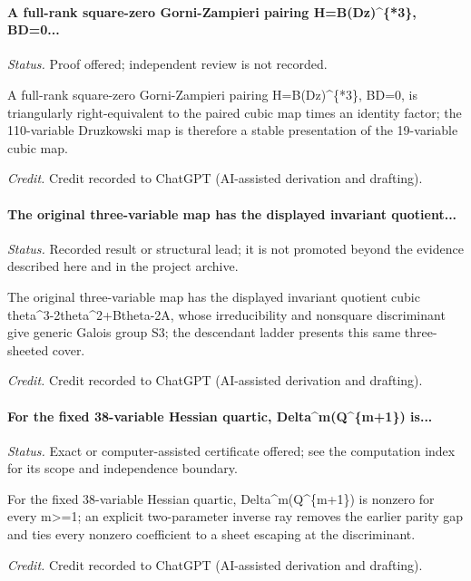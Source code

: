 \label{supp-note-05-019}
\paragraph{A full-rank square-zero Gorni-Zampieri pairing H=B(Dz)\textasciicircum{}\{*3\}, BD=0...}
\emph{Status.} Proof offered; independent review is not recorded.

A full-rank square-zero Gorni-Zampieri pairing H=B(Dz)\textasciicircum{}\{*3\}, BD=0, is triangularly right-equivalent to the paired cubic map times an identity factor; the 110-variable Druzkowski map is therefore a stable presentation of the 19-variable cubic map.

\emph{Credit.} Credit recorded to ChatGPT (AI-assisted derivation and drafting).

\label{supp-note-05-020}
\paragraph{The original three-variable map has the displayed invariant quotient...}
\emph{Status.} Recorded result or structural lead; it is not promoted beyond the evidence described here and in the project archive.

The original three-variable map has the displayed invariant quotient cubic theta\textasciicircum{}3-2theta\textasciicircum{}2+Btheta-2A, whose irreducibility and nonsquare discriminant give generic Galois group S3; the descendant ladder presents this same three-sheeted cover.

\emph{Credit.} Credit recorded to ChatGPT (AI-assisted derivation and drafting).

\label{supp-note-05-021}
\paragraph{For the fixed 38-variable Hessian quartic, Delta\textasciicircum{}m(Q\textasciicircum{}\{m+1\}) is...}
\emph{Status.} Exact or computer-assisted certificate offered; see the computation index for its scope and independence boundary.

For the fixed 38-variable Hessian quartic, Delta\textasciicircum{}m(Q\textasciicircum{}\{m+1\}) is nonzero for every m>=1; an explicit two-parameter inverse ray removes the earlier parity gap and ties every nonzero coefficient to a sheet escaping at the discriminant.

\emph{Credit.} Credit recorded to ChatGPT (AI-assisted derivation and drafting).

